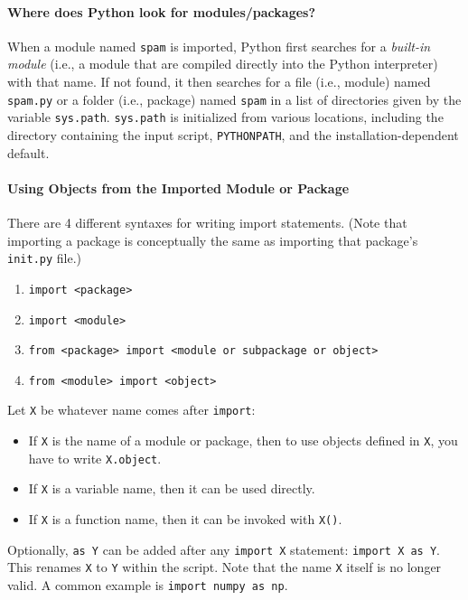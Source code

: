 \documentclass[12pt]{article}
\begin{document}
\paragraph{Where does Python look for modules/packages?}
When a module named \texttt{spam} is imported, Python first searches for a \emph{built-in module} (i.e., a module that are compiled directly into the Python interpreter) with that name. If not found, it then searches for a file (i.e., module) named \texttt{spam.py} or a folder (i.e., package) named \texttt{spam} in a list of directories given by the variable \texttt{sys.path}. \texttt{sys.path} is initialized from various locations, including the directory containing the input script, \texttt{PYTHONPATH}, and the installation-dependent default.

\paragraph{Using Objects from the Imported Module or Package}
There are 4 different syntaxes for writing import statements. (Note that importing a package is conceptually the same as importing that package's \texttt{\ttul\ttul init\ttul\ttul.py} file.)
\begin{enumerate}
    \item \texttt{import <package>}
    \item \texttt{import <module>}
    \item \texttt{from <package> import <module or subpackage or object>}
    \item \texttt{from <module> import <object>}
\end{enumerate}

Let \texttt{X} be whatever name comes after \texttt{import}:
\begin{itemize}
    \item If \texttt{X} is the name of a module or package, then to use objects defined in \texttt{X}, you have to write \texttt{X.object}.
    \item If \texttt{X} is a variable name, then it can be used directly.
    \item If \texttt{X} is a function name, then it can be invoked with \texttt{X()}.
\end{itemize}
Optionally, \texttt{as Y} can be added after any \texttt{import X} statement: \texttt{import X as Y}. This renames \texttt{X} to \texttt{Y} within the script. Note that the name \texttt{X} itself is no longer valid. A common example is \texttt{import numpy as np}.
\end{document}
